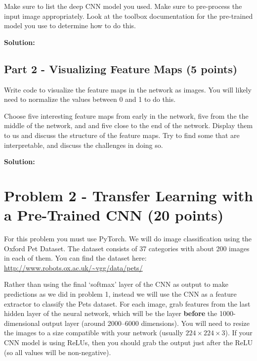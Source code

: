 \documentclass[11pt, oneside]{article}   	%
\begin{document}
Make sure to list the deep CNN model you used. Make sure to pre-process the input image appropriately. Look at the toolbox documentation for the pre-trained model you use to determine how to do this. 

\textbf{Solution:} \\



\subsection*{Part 2 - Visualizing Feature Maps (5 points)}

Write code to visualize the feature maps in the network as images. You will likely need to normalize the values between 0 and 1 to do this. %

Choose five interesting feature maps from early in the network, five from the the middle of the network, and and five close to the end of the network. Display them to us and discuss  the structure of the feature maps. Try to find some that are interpretable, and discuss the challenges in doing so. 

\textbf{Solution:} \\


\section*{Problem 2 - Transfer Learning with a Pre-Trained CNN (20 points)}

For this problem you must use PyTorch. We will do image classification using the Oxford Pet Dataset. The dataset consists of 37 categories with about 200 images in each of them. You can find the dataset here: \url{http://www.robots.ox.ac.uk/~vgg/data/pets/}


Rather than using the final `softmax' layer of the CNN as output to make predictions as we did in problem 1, instead we will use the CNN as a feature extractor to classify the Pets dataset. For each image, grab features from the last hidden layer of the neural network, which will be the layer \textbf{before} the 1000-dimensional output layer (around 2000--6000 dimensions). You will need to resize the images to a size compatible with your network (usually $224 \times 224 \times 3$). If your CNN model is using ReLUs, then you should grab the output just after the ReLU (so all values will be non-negative). 
\end{document}
